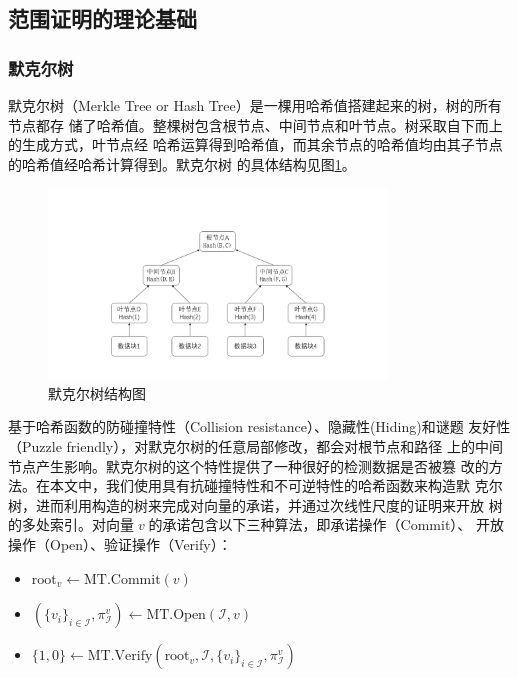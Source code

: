 \documentclass[zihao=-4]{ctexart}
\begin{document}
\subsection{范围证明的理论基础}
\subsubsection{默克尔树}
默克尔树\cite{Merkle}（Merkle Tree or Hash Tree）是一棵用哈希值搭建起来的树，树的所有节点都存
储了哈希值。整棵树包含根节点、中间节点和叶节点。树采取自下而上的生成方式，叶节点经
哈希运算得到哈希值，而其余节点的哈希值均由其子节点的哈希值经哈希计算得到。默克尔树
的具体结构见图\ref{Merkle}。
\begin{figure}[H]
  \centering
  \includegraphics[width=0.8\textwidth]{Merkle_tree.bmp} 
  \caption{默克尔树结构图}
  \label{Merkle}
\end{figure}
基于哈希函数的防碰撞特性（Collision resistance）、隐藏性(Hiding)和谜题
友好性（Puzzle friendly），对默克尔树的任意局部修改，都会对根节点和路径
上的中间节点产生影响。默克尔树的这个特性提供了一种很好的检测数据是否被篡
改的方法。在本文中，我们使用具有抗碰撞特性和不可逆特性的哈希函数来构造默
克尔树，进而利用构造的树来完成对向量的承诺，并通过次线性尺度的证明来开放
树的多处索引。对向量$\;v\;$的承诺包含以下三种算法，即承诺操作（Commit）、
开放操作（Open）、验证操作（Verify）：
\begin{itemize}
  \item $\text{root}_v\leftarrow \text{MT.Commit}(v)$
  \item $(\{v_i\}_{i\in\mathcal{I}},\pi^v_{\mathcal{I}})\leftarrow\text{MT.Open}(\mathcal{I},v)$
  \item $\{1,0\}\leftarrow\text{MT.Verify}(\text{root}_v,\mathcal{I},\{v_i\}_{i\in\mathcal{I}},\pi^v_{\mathcal{I}})$
\end{itemize}
\end{document}
